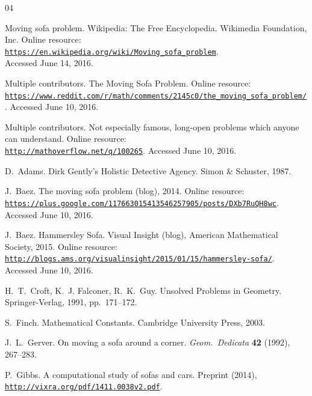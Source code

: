 \documentclass[11pt]{article}
\begin{document}
\begin{thebibliography}{04}

 Moving sofa problem. Wikipedia: The Free Encyclopedia. Wikimedia Foundation, Inc. Online resource: \\ \href{https://en.wikipedia.org/wiki/Moving\_sofa\_problem}{\texttt{https://en.wikipedia.org/wiki/Moving\_sofa\_problem}}. \\ Accessed June 14, 2016.

 Multiple contributors. The Moving Sofa Problem. Online resource: \\ {\small \href{https://www.reddit.com/r/math/comments/2145c0/the\_moving\_sofa\_problem/}{\texttt{https://www.reddit.com/r/math/comments/2145c0/the\_moving\_sofa\_problem/}}.} Accessed June 10, 2016.

 Multiple contributors. Not especially famous, long-open problems which anyone can understand. Online resource: \\
{\small \href{http://mathoverflow.net/q/100265}{\texttt{http://mathoverflow.net/q/100265}}.} Accessed June 10, 2016.

 D.~Adams. Dirk Gently's Holistic Detective Agency. Simon \& Schuster, 1987.

 J.~Baez. The moving sofa problem (blog), 2014. Online resource: {\small \href{https://plus.google.com/117663015413546257905/posts/DXb7RuQH8wc}{\texttt{https://plus.google.com/117663015413546257905/posts/DXb7RuQH8wc}}.} Accessed June 10, 2016.

 J.~Baez. Hammersley Sofa. Visual Insight (blog), American Mathematical Society, 2015. Online resource:\\ {\small \href{http://blogs.ams.org/visualinsight/2015/01/15/hammersley-sofa/}{\texttt{http://blogs.ams.org/visualinsight/2015/01/15/hammersley-sofa/}}.} Accessed June 10, 2016.

 H.~T.~Croft, K.~J. Falconer, R.~K.~Guy. Unsolved Problems in Geometry. Springer-Verlag, 1991, pp.~171--172.

 S.~Finch. Mathematical Constants. Cambridge University Press, 2003.

J.~L.~Gerver. On moving a sofa around a corner. 
\textit{Geom.~Dedicata} \textbf{42} (1992), 267--283.

 P.~Gibbs. A computational study of sofas and cars. Preprint (2014), \href{http://vixra.org/pdf/1411.0038v2.pdf}{\texttt{http://vixra.org/pdf/1411.0038v2.pdf}}.


\end{thebibliography}
\end{document}
